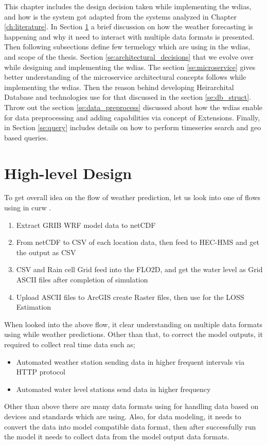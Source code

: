 This chapter includes the design decision taken while implementing the \acrfull{wdias}, and how is the system got adapted from the systems analyzed in Chapter \ref{ch:literature}. %
In Section \ref{se:high_level_design} a brief discussion on how the weather forecasting is happening and why it need to interact with multiple data formats is presented. Then following subsections define few termelogy which are using in the \acrshort{wdias}, and scope of the thesis.
Section \ref{se:architectural_decisions} that we evolve over while designing and implementing the \acrshort{wdias}.
The section \ref{se:microservice} gives better understanding of the microservice architectural concepts follows while implementing the \acrshort{wdias}.
Then the reason behind developing Heirarchital Database and technologies use for that discussed in the section \ref{se:db_struct}.
Throw out the section \ref{se:data_preprocess} discussed about how the \acrshort{wdias} enable for data preprocessing and adding capabilities via concept of Extensions.
Finally, in Section \ref{se:query} includes details on how to perform timeseries search and geo based queries.

\section{High-level Design}
\label{se:high_level_design}

To get overall idea on the flow of weather prediction, let us look into one of flows using in \acrshort{curw} \cite{CUrWSL2017SL}.

\begin{enumerate}
    \item Extract GRIB WRF model data to netCDF
    \item From netCDF to CSV of each location data, then feed to HEC-HMS and get the output as CSV
    \item CSV and Rain cell Grid feed into the FLO2D, and get the water level as Grid ASCII files after completion of simulation
    \item Upload ASCII files to ArcGIS create Raster files, then use for the LOSS Estimation
\end{enumerate}
When looked into the above flow, it clear understanding on multiple data formats using while weather predictions.
Other than that, to correct the model outputs, it required to collect real time data such as;
\begin{itemize}
    \item Automated weather station sending data in higher frequent intervals via HTTP protocol
    \item Automated water level stations send data in higher frequency
\end{itemize}
Other than above there are many data formats using for handling data based on devices and standards which are using. Also, for data modeling, it needs to convert the data into model compatible data format, then after successfully run the model it needs to collect data from the model output data formats.

